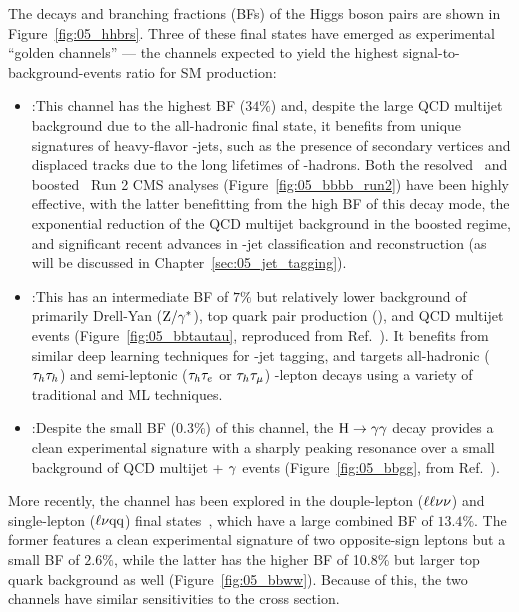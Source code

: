 The decays and branching fractions (BFs) of the Higgs boson pairs are shown in Figure~\ref{fig:05_hhbrs}.
Three of these final states have emerged as experimental ``golden channels'' --- the channels expected to yield the highest signal-to-background-events ratio for SM \HH production:
\begin{itemize}
    \item \bbbb:\quad This channel has the highest BF ($34\%$) and, despite the large QCD multijet background due to the all-hadronic final state, it benefits from unique signatures of heavy-flavor \Pb-jets, such as the presence of secondary vertices and displaced tracks due to the long lifetimes of \Pb-hadrons.
    Both the resolved~\cite{CMS:2022cpr} and boosted~\cite{CMS:2022gjd} Run 2 CMS analyses (Figure~\ref{fig:05_bbbb_run2}) have been highly effective, with the latter benefitting from the high BF of this decay mode, the exponential reduction of the QCD multijet background in the boosted regime, and significant recent advances in \bbbar-jet classification and reconstruction (as will be discussed in Chapter~\ref{sec:05_jet_tagging}). 
    \item \bbtautau:\quad This has an intermediate BF of $7\%$ but relatively lower background of primarily Drell-Yan ($\textrm{Z}/\gamma^*$), top quark pair production (\ttbar), and QCD multijet events (Figure~\ref{fig:05_bbtautau}, reproduced from Ref.~\cite{CMS:2022hgz}).
    It benefits from similar deep learning techniques for \Pb-jet tagging, and targets all-hadronic ($\tau_h\tau_h$) and semi-leptonic ($\tau_h\tau_e$ or $\tau_h\tau_\mu$) \PGt-lepton decays using a variety of traditional and ML techniques.
    \item \bbgg:\quad Despite the small BF ($0.3\%$) of this channel, the $\textrm{H}\to\gamma\gamma$ decay provides a clean experimental signature with a sharply peaking resonance over a small background of QCD multijet + $\gamma$ events (Figure~\ref{fig:05_bbgg}, from Ref.~\cite{CMS:2020tkr}).
\end{itemize}

More recently, the \bbww channel has been explored in the douple-lepton ($\ell\ell\nu\nu$) and single-lepton ($\ell\nu\textrm{q}\textrm{q}$) \ww final states~\cite{CMS:2024rgy}, which have a large combined BF of $13.4\%$.
The former features a clean experimental signature of two opposite-sign leptons but a small BF of $2.6\%$, while the latter has the higher BF of 10.8\% but larger top quark background as well (Figure~\ref{fig:05_bbww}).
Because of this, the two channels have similar sensitivities to the \HH cross section.

